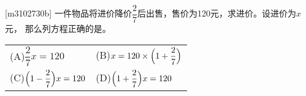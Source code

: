 [m3102730b]\quad
一件物品将进价降价$\dfrac{2}{7}$后出售，售价为120元，求进价。设进价为$x$元，
那么列方程正确的是。 \par
\hspace{7em}
\begin{tabular}{ll}
    (A)\quad $\dfrac{2}{7}x=120$ &
    (B)\quad $x=120\times \Bigl(1+\dfrac{2}{7}\Bigr)$ \\
    (C)\quad $\Bigl(1-\dfrac{2}{7}\Bigr)x=120$ &
    (D)\quad $\Bigl(1+\dfrac{2}{7}\Bigr)x=120$
\end{tabular}
\par
